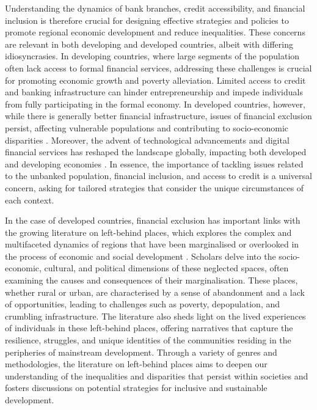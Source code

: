 \documentclass[a4paper,11pt,oneside]{article}
\begin{document}
Understanding the dynamics of bank branches, credit accessibility, and financial inclusion is therefore crucial for designing effective strategies and policies to promote regional economic development and reduce inequalities. These concerns are relevant in both developing and developed countries, albeit with differing idiosyncrasies. In developing countries, where large segments of the population often lack access to formal financial services, addressing these challenges is crucial for promoting economic growth and poverty alleviation. Limited access to credit and banking infrastructure can hinder entrepreneurship and impede individuals from fully participating in the formal economy. In developed countries, however, while there is generally better financial infrastructure, issues of financial exclusion persist, affecting vulnerable populations and contributing to socio-economic disparities \citep{carbo.gardener.molyneux2005financial.exclusion,leyshon.thrift1996financial,rodriguez2025banking,bernad.fuentelsaz.gomez2008deregulation}. Moreover, the advent of technological advancements and digital financial services has reshaped the landscape globally, impacting both developed and developing economies \citep{philippon2019fintech}. In essence, the importance of tackling issues related to the unbanked population, financial inclusion, and access to credit is a universal concern, asking for tailored strategies that consider the unique circumstances of each context.


In the case of developed countries, financial exclusion has important links with the growing literature on left-behind places, which explores the complex and multifaceted dynamics of regions that have been marginalised or overlooked in the process of economic and social development \citep{rodriguez2018revenge,pike2024left,phelps2025abandoned}. Scholars delve into the socio-economic, cultural, and political dimensions of these neglected spaces, often examining the causes and consequences of their marginalisation. These places, whether rural or urban, are characterised by a sense of abandonment and a lack of opportunities, leading to challenges such as poverty, depopulation, and crumbling infrastructure. The literature also sheds light on the lived experiences of individuals in these left-behind places, offering narratives that capture the resilience, struggles, and unique identities of the communities residing in the peripheries of mainstream development. Through a variety of genres and methodologies, the literature on left-behind places aims to deepen our understanding of the inequalities and disparities that persist within societies and fosters discussions on potential strategies for inclusive and sustainable development.
\end{document}
